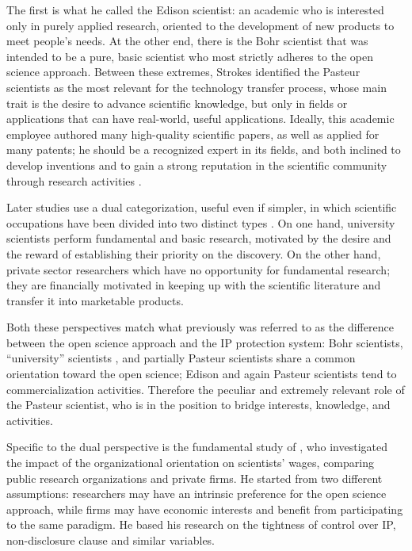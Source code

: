 The first is what he called the Edison scientist: an academic who is interested only in purely applied research, oriented to the development of new products to meet people's needs. At the other end, there is the Bohr scientist that was intended to be a pure, basic scientist who most strictly adheres to the open science approach. Between these extremes, Strokes identified the Pasteur scientists as the most relevant for the technology transfer process, whose main trait is the desire to advance scientific knowledge, but only in fields or applications that can have real-world, useful applications. Ideally, this academic employee authored many high-quality scientific papers, as well as applied for many patents; he should be a recognized expert in its fields, and both inclined to develop inventions and to gain a strong reputation in the scientific community through research activities \citep{Baba2009}.

Later studies use a dual categorization, useful even if simpler, in which scientific occupations have been divided into two distinct types \citep{Beath2000}. On one hand, university scientists perform fundamental and basic research, motivated by the desire and the reward of establishing their priority on the discovery. On the other hand, private sector researchers which have no opportunity for fundamental research; they are financially motivated in keeping up with the scientific literature and transfer it into marketable products. 

Both these perspectives match what previously was referred to as the difference between the open science approach and the IP protection system: Bohr scientists, \enquote{university} scientists \citep{Beath2000}, and partially Pasteur scientists share a common orientation toward the open science; Edison and again Pasteur scientists tend to commercialization activities. Therefore the peculiar and extremely relevant role of the Pasteur scientist, who is in the position to bridge interests, knowledge, and activities.

Specific to the dual perspective is the fundamental study of \citet{Stern2004}, who investigated the impact of the organizational orientation on scientists' wages, comparing public research organizations and private firms. He started from two different assumptions: researchers may have an intrinsic preference for the open science approach, while firms may have economic interests and benefit from participating to the same paradigm. He based his research on the tightness of control over IP, non-disclosure clause and similar variables.

